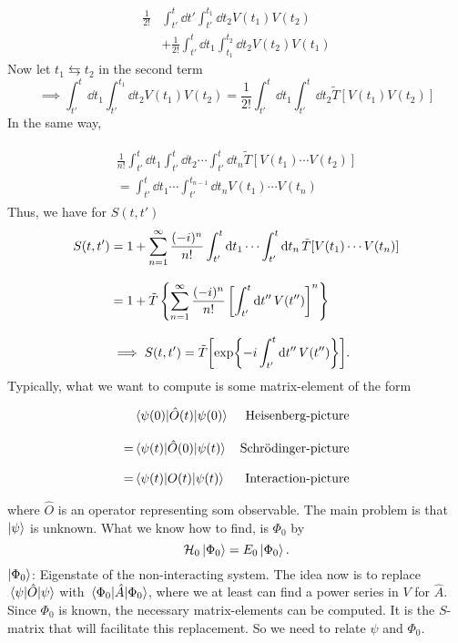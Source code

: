 \begin{align*} 
\frac{1}{2!}&\int_{t'}^{t}\dd{t'}\int_{t'}^{t_1}\dd{t_2}V(t_1)V(t_2)\\
&+\frac{1}{2!}\int_{t'}^{t}\dd{t_1}\int_{t_1}^{t_2}\dd{t_2}V(t_2)V(t_1)
\end{align*}
Now let $t_1 \leftrightarrows t_2$ in the second term
\begin{equation} 
\implies  \int_{t'}^{t}\dd{t_1}\int_{t'}^{t_1}\dd{t_2}V(t_1)V(t_2) = \frac{1}{2!}\int_{t'}^{t}\dd{t_1}\int_{t'}^{t}\dd{t_2}\tilde{T}[V(t_1)V(t_2)]
\end{equation}
In the same way, 

\begin{align}
\begin{split} 
\frac{1}{n!}\int_{t'}^{t}\dd{t_1}\int_{t'}^{t}\dd{t_2}\cdots \int_{t'}^{t}\dd{t_n}\tilde{T}[V(t_1)\cdots V(t_2)] \\[2ex]
=\int_{t'}^t\dd{t_1}\cdots\int_{t'}^{t_{n-1}}\dd{t_n}V(t_1)\cdots V(t_n)
\end{split}
\end{align}
Thus, we have for $S(t,t')$
\begin{align} 
\nonumber
S(t, t') &= 1 + \sum_{n=1}^{\infty}\frac{(-i)^n}{n!}\int_{t'}^{t}\dd{t_1}\cdots\int_{t'}^{t}\dd{t_n}\tilde{T}[V(t_1)\cdots V(t_n)] \\[2ex]
&= 1 + \tilde{T}\left\{\sum_{n=1}^{\infty}\frac{(-i)^n}{n!}\left[\int_{t'}^{t}\dd{t''}V(t'')\right]^n \right\}\nonumber \\[2ex]
&\implies S(t, t') = \tilde{T}\qty[\exp{\displaystyle -i\int_{t'}^{t}\dd{t''}V(t'')}]. \label{eq:s_matrix}
\end{align}
Typically, what we want to compute is some matrix-element of the form 

\begin{align}
\nonumber
&\ev{\hat{O}(t)}{\psi(0)} & \text{Heisenberg-picture} \\[2ex] \label{eq:pictures}
= &\ev{\hat{O}(0)}{\psi(t)} & \text{Schrödinger-picture} \\[2ex]
= &\ev{O(t)}{\psi(t)} & \text{Interaction-picture}
\nonumber
\end{align}

where $\hat{O}$ is an operator representing som observable. The main problem is that $\ket{\psi}$ is unknown. What we know how to find, is $\Phi_0$ by
\begin{equation} 
\mathcal{H}_0\ket{\Phi_0} = E_0\ket{\Phi_0}.
\end{equation}
$\ket{\Phi_0}$: Eigenstate of the non-interacting system. The idea now is to replace $\ev{\hat{O}}{\psi}$ with $\ev{\hat A}{\Phi_0}$, where we at least can find a power series in $V$ for $\hat{A}$.  Since $\Phi_0$ is known, the necessary matrix-elements can be computed. It is the $S$-matrix that will facilitate this replacement. So we need to relate $\psi$ and $\Phi_0$. 

